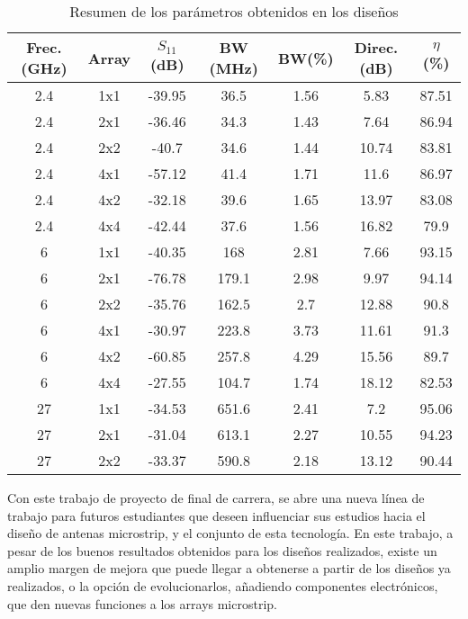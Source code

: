 \begin{table}
\centering
\small
\begin{tabular}{c c c c c c c}
\toprule[\heavyrulewidth]\toprule[\heavyrulewidth]
\hline

\textbf{Frec. (GHz)} &\textbf{ Array} & \textbf{$S_{11}$ (dB)}  & \textbf{BW (MHz)} &\textbf{ BW(\%)} & \textbf{Direc. (dB)} & \textbf{$\eta$ (\%)} \\
\midrule
2.4 & 1x1 & -39.95 & 36.5 & 1.56 & 5.83 & 87.51 \\ 
2.4 & 2x1 & -36.46 & 34.3 & 1.43 & 7.64 & 86.94 \\ 
2.4 & 2x2 & -40.7 & 34.6 & 1.44 & 10.74 & 83.81 \\ 
2.4 & 4x1 & -57.12 & 41.4 & 1.71 & 11.6 & 86.97 \\ 
2.4 & 4x2 & -32.18 & 39.6 & 1.65 & 13.97 & 83.08 \\ 
2.4 & 4x4 & -42.44 & 37.6 & 1.56 & 16.82 & 79.9 \\ 
6 & 1x1 & -40.35 & 168 & 2.81 & 7.66 & 93.15 \\ 
6 & 2x1 & -76.78 & 179.1 & 2.98 & 9.97 & 94.14 \\ 
6 & 2x2 & -35.76 & 162.5 & 2.7 & 12.88 & 90.8 \\ 
6 & 4x1 & -30.97 & 223.8 & 3.73 & 11.61 & 91.3 \\ 
6 & 4x2 & -60.85 & 257.8 & 4.29 & 15.56 & 89.7 \\ 
6 & 4x4 & -27.55 & 104.7 & 1.74 & 18.12 & 82.53 \\ 
27 & 1x1 & -34.53 & 651.6 & 2.41 & 7.2 & 95.06 \\ 
27 & 2x1 & -31.04 & 613.1 & 2.27 & 10.55 & 94.23 \\ 
27 & 2x2 & -33.37 & 590.8 & 2.18 & 13.12 & 90.44 \\ 
   \bottomrule[\heavyrulewidth]

\end{tabular}
\label{tab:final}
   \caption{Resumen de los parámetros obtenidos en los diseños}
\end{table}
\par Con este trabajo de proyecto de final de carrera, se abre una nueva línea de trabajo para futuros estudiantes que deseen influenciar sus estudios hacia el diseño de antenas microstrip, y el conjunto de esta tecnología. En este trabajo, a pesar de los buenos resultados obtenidos para los diseños realizados, existe un amplio margen de mejora que puede llegar a obtenerse a partir de los diseños ya realizados, o la opción de evolucionarlos, añadiendo componentes electrónicos, que den nuevas funciones a los arrays microstrip.
